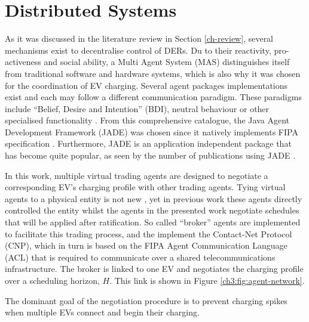 \section{Distributed Systems}
\label{ch3:sec:distributed-systems}

As it was discussed in the literature review in Section \ref{ch-review}, several mechanisms exist to decentralise control of DERs.
Du to their reactivity, pro-activeness and social ability, a Multi Agent System (MAS) distinguishes itself from traditional software and hardware systems, which is also why it was chosen for the coordination of EV charging.
Several agent packages implementations exist and each may follow a different communication paradigm.
These paradigms include ``Belief, Desire and Intention'' (BDI), neutral behaviour or other specialised functionality \cite{Luck2004}.
From this comprehensive catalogue, the Java Agent Development Framework (JADE) was chosen since it natively implements FIPA specification \cite{JADE-website, FIPA-agent-specs}.
Furthermore, JADE is an application independent package that has become quite popular, as seen by the number of publications using JADE \cite{Karfopoulos2013, Eddy2011, Kuo2013, Mocci2014, Li2017}.

In this work, multiple virtual trading agents are designed to negotiate a corresponding EV's charging profile with other trading agents.
Tying virtual agents to a physical entity is not new \cite{Nagata2002, Dimeas2005, Nguyen2011, Nagata2012}, yet in previous work these agents directly controlled the entity whilst the agents in the presented work negotiate schedules that will be applied after ratification.
So called ``broker'' agents are implemented to facilitate this trading process, and the implement the Contact-Net Protocol (CNP), which in turn is based on the FIPA Agent Communication Language (ACL) that is required to communicate over a shared telecommunications infrastructure.
The broker is linked to one EV and negotiates the charging profile over a scheduling horizon, $H$.
This link is shown in Figure \ref{ch3:fig:agent-network}.



The dominant goal of the negotiation procedure is to prevent charging spikes when multiple EVs connect and begin their charging.
